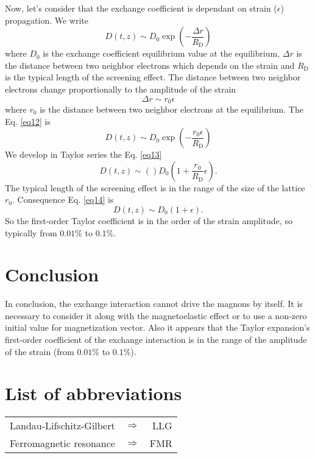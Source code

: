 \documentclass[12pt,a4paper]{article}
\begin{document}
Now, let's consider that the exchange coefficient is dependant on strain ($\epsilon$) propagation.
We write
\begin{equation}
    D \left( t, z \right) \sim D_{0} \exp \left( -\frac{\Delta r}{R_{\mathrm{D}}} \right)
    \label{eq12}
\end{equation}
where $D_0$ is the exchange coefficient equilibrium value at the equilibrium, $\Delta r$ is the distance between two neighbor electrons which depends on the strain and $R_{\mathrm{D}}$ is the typical length of the screening effect.
The distance between two neighbor electrons change proportionally to the amplitude of the strain $$ \Delta r \sim r_0 \epsilon$$
where $r_0$ is the distance between two neighbor electrons at the equilibrium.
The Eq. \eqref{eq12} is
\begin{equation}
    D \left( t, z \right) \sim D_{0} \exp \left( -\frac{r_0 \epsilon}{R_{\mathrm{D}}} \right)
    \label{eq13}
\end{equation}
We develop in Taylor series the Eq. \eqref{eq13}
\begin{equation}
    D \left( t, z \right) \sim () D_{0} \left( 1 + \frac{r_0}{R_{\mathrm{D}}} \epsilon \right).
    \label{eq14}
\end{equation}
The typical length of the screening effect is in the range of the size of the lattice $r_0$.
Consequence Eq. \eqref{eq14} is
\begin{equation}
    D \left( t, z \right) \sim D_{0} \left( 1 + \epsilon \right).
    \label{eq15}
\end{equation}
So the first-order Taylor coefficient is in the order of the strain amplitude, so typically from $0.01 \%$ to $0.1\%$.

\section{Conclusion}

In conclusion, the exchange interaction cannot drive the magnons by itself.
It is necessary to consider it along with the magnetoelastic effect or to use a non-zero initial value for magnetization vector.
Also it appears that the Taylor expansion's first-order coefficient of the exchange interaction is in the range of the amplitude of the strain (from $0.01 \%$ to $0.1\%$).

\newpage

\section*{List of abbreviations}

\begin{table}[ht]
    \begin{tabular}{ l c r }
        Landau-Lifschitz-Gilbert & $\Longrightarrow$ & LLG \\
        Ferromagnetic resonance & $\Longrightarrow$ & FMR \\
    \end{tabular}
\end{table}



\end{document}
